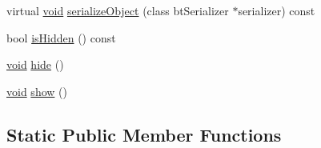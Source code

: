 \begin{DoxyCompactItemize}
virtual \mbox{\hyperlink{_thread_8h_af1e856da2e658414cb2456cb6f7ebc66}{void}} \mbox{\hyperlink{classnjli_1_1_textbox_h_u_d_a4fc4bcd9d1930911474210c047372fc0}{serialize\+Object}} (class bt\+Serializer $\ast$serializer) const
\item 
bool \mbox{\hyperlink{classnjli_1_1_textbox_h_u_d_a3009efb11b4bcd56bd933c21b230a125}{is\+Hidden}} () const
\item 
\mbox{\hyperlink{_thread_8h_af1e856da2e658414cb2456cb6f7ebc66}{void}} \mbox{\hyperlink{classnjli_1_1_textbox_h_u_d_a5d7b8b3bc421084f282343e506a6d289}{hide}} ()
\item 
\mbox{\hyperlink{_thread_8h_af1e856da2e658414cb2456cb6f7ebc66}{void}} \mbox{\hyperlink{classnjli_1_1_textbox_h_u_d_a73ffd499fceaacd59b518a541ed2133e}{show}} ()
\end{DoxyCompactItemize}
\subsection*{Static Public Member Functions}
